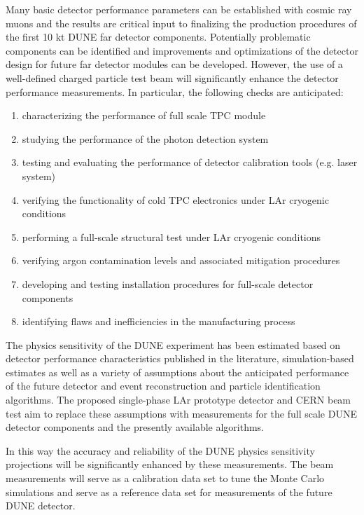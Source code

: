 Many basic detector performance parameters can be established with cosmic ray muons and the results are critical input to finalizing the production procedures of the first 10 kt DUNE far detector components. Potentially problematic components can be identified and improvements and optimizations of the detector design for future far detector modules can be developed. However, the use of a well-defined charged particle test beam will significantly enhance the detector performance measurements.
In particular, the following checks are anticipated:
\begin{enumerate}
 \item characterizing the performance of full scale TPC module
 \item studying the performance of the photon detection system
 \item testing and evaluating the performance of detector calibration tools (e.g. laser system)
  \item verifying the functionality of cold TPC electronics under LAr cryogenic conditions
  \item performing a full-scale structural test under LAr cryogenic conditions
  \item verifying argon contamination levels and associated mitigation procedures
  \item developing and testing installation procedures for full-scale detector components
  \item identifying flaws and inefficiencies in the manufacturing process
\end{enumerate}

The physics sensitivity of the DUNE experiment has been estimated based on detector performance characteristics published in the literature, simulation-based estimates as well as a variety of assumptions about the anticipated performance of the future detector and event reconstruction and particle identification algorithms.
The proposed single-phase LAr prototype detector and CERN beam test aim to replace these assumptions with measurements for the full scale DUNE detector components and the presently available algorithms.

In this way the accuracy and reliability of the DUNE physics sensitivity projections will be significantly enhanced by these measurements.  The beam measurements will serve as a calibration data set to tune the Monte Carlo simulations and serve as a reference data set for measurements of the future DUNE detector. \\
%

